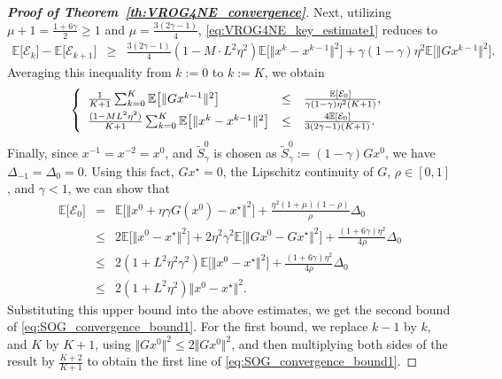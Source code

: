 \documentclass{article}
\newcommand{\norms}[1]{\Vert#1\Vert}
\newcommand{\Expk}[1]{\mathbb{E}\big[#1\big]}
\newcommand{\Ec}{\mathcal{E}}
\theoremstyle{plain}
\theoremstyle{definition}
\theoremstyle{remark}
\begin{document}
\begin{proof}[\textbf{Proof of Theorem~\ref{th:VROG4NE_convergence}}]
Next, utilizing $\mu + 1 = \frac{1 + 6\gamma}{2} \geq 1$ and $\mu = \frac{3(2\gamma-1)}{4}$,  \eqref{eq:VROG4NE_key_estimate1} reduces to
\begin{equation*} 
\begin{array}{lcl}
\Expk{\Ec_k} - \Expk{ \Ec_{k+1} } & \geq & \frac{3(2\gamma - 1)}{4} \left( 1 - M \cdot L^2\eta^2  \right) \Expk{ \norms{x^k - x^{k-1}}^2  } + \gamma(1-\gamma)  \eta^2 \Expk{ \norms{Gx^{k-1}}^2 }.
\end{array}
\end{equation*}
Averaging this inequality from $k:=0$ to $k:=K$, we obtain
\begin{equation*} 
\left\{\begin{array}{lcl}
\frac{1}{K+1}\sum_{k=0}^{K} \Expk{ \norms{Gx^{k-1}}^2 }  & \leq &  \frac{ \mathbb{E}[\Ec_0] }{\gamma(1-\gamma)\eta^2(K + 1)}, \vspace{0.5ex}\\
\frac{(1 - M L^2\eta^2)}{K+1}\sum_{k=0}^{K} \Expk{ \norms{x^k - x^{k-1}}^2 } & \leq & \frac{ 4 \mathbb{E}[ \Ec_0] }{3(2\gamma-1)(K + 1)}.
\end{array}\right.
\end{equation*}
Finally, since $x^{-1} = x^{-2} = x^0$, and $\widetilde{S}_{\gamma}^0$ is chosen as $\widetilde{S}_{\gamma}^0 := (1-\gamma)Gx^0$, we have $\Delta_{-1} = \Delta_0 = 0$.
Using this fact, $Gx^{\star} = 0$, the Lipschitz continuity of $G$,  $\rho \in [0, 1]$, and $\gamma < 1$, we can show that
\begin{equation*}
\begin{array}{lcl}
\Expk{ \Ec_0 } & = & \Expk{ \norms{x^0 + \eta\gamma G(x^{0}) - x^{\star}}^2 } +  \frac{ \eta^2(1+\mu)(1-\rho)}{\rho} \Delta_0 \\
& \leq &  2 \Expk{ \norms{x^0 - x^{\star}}^2 } + 2\eta^2\gamma^2 \Expk{ \norms{Gx^0 - Gx^{\star}}^2}  +  \frac{(1+6\gamma) \eta^2}{4\rho} \Delta_0 \\
&  \leq & 2(1 + L^2\eta^2\gamma^2) \Expk{ \norms{x^0 - x^{\star}}^2 }  +  \frac{(1+6\gamma) \eta^2}{4 \rho} \Delta_0 \\
& \leq  &  2\left(1 + L^2\eta^2\right) \norms{x^0 - x^{\star}}^2. 
\end{array}
\end{equation*}
Substituting this upper bound into the above estimates, we get the second bound of \eqref{eq:SOG_convergence_bound1}.
For the first bound, we replace $k-1$ by $k$, and $K$ by $K+1$, using $\norms{Gx^0}^2 \leq 2\norms{Gx^0}^2$, and then multiplying both sides of the result by $\frac{K+2}{K+1}$ to obtain the first line of \eqref{eq:SOG_convergence_bound1}.
\end{proof}
\end{document}
